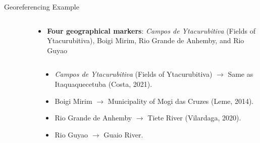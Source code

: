 \documentclass[aspectratio=1610]{beamer}
\begin{document}
\begin{frame}{Georeferencing Example}
    {
        \begin{columns}
            \begin{column}{0.5\textwidth}
                \begin{figure}[h!]
                    \begin{center}
                    \vspace{3mm}
                    \end{center}
                \end{figure}
            \end{column}

            \begin{column}{0.5\textwidth}
                \begin{itemize}
                    \item \textbf{Four geographical markers}: \textit{Campos de Ytacurubitiva} (Fields of Ytacurubitiva), Boigi Mirim,  Rio Grande de Anhemby, and Rio Guyao
                \end{itemize}
            \end{column}
        \end{columns}
    }

    {
        \begin{columns}
            \begin{column}{0.5\textwidth}
                \begin{figure}[h!]
                    \begin{center}
                    \vspace{3mm}
                    \end{center}
                \end{figure}
            \end{column}

            \begin{column}{0.5\textwidth}
                \begin{itemize}
                    \item<2-5> \textit{Campos de Ytacurubitiva} (Fields of Ytacurubitiva) $\rightarrow$ Same as Itaquaquecetuba (Costa, 2021).
                    \item<3-5> Boigi Mirim $\rightarrow$ Municipality of Mogi das Cruzes (Leme, 2014).
                    \item<4-5> Rio Grande de Anhemby $\rightarrow$ Tiete River (Vilardaga, 2020).
                    \item<5-5> Rio Guyao $\rightarrow$ Guaio River.
                \end{itemize}
            \end{column}
        \end{columns}
    }


\end{frame}
\end{document}
